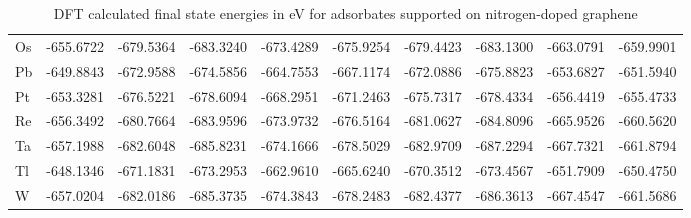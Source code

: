 \begin{table}[h]
{\begin{tabular}{*{10}{l}}
      Os	& -655.6722	&-679.5364	&-683.3240  &-673.4289	&-675.9254	&-679.4423	&-683.1300	&-663.0791	&-659.9901 \\
      Pb	& -649.8843	&-672.9588	&-674.5856	&-664.7553	&-667.1174	&-672.0886	&-675.8823	&-653.6827	&-651.5940 \\
      Pt	& -653.3281	&-676.5221	&-678.6094	&-668.2951	&-671.2463	&-675.7317	&-678.4334	&-656.4419	&-655.4733 \\
      Re	& -656.3492	&-680.7664	&-683.9596	&-673.9732	&-676.5164	&-681.0627	&-684.8096	&-665.9526	&-660.5620 \\
      Ta	& -657.1988	&-682.6048	&-685.8231	&-674.1666	&-678.5029	&-682.9709	&-687.2294	&-667.7321	&-661.8794 \\
      Tl	& -648.1346	&-671.1831	&-673.2953	&-662.9610  &-665.6240  &-670.3512	&-673.4567	&-651.7909	&-650.4750 \\
      W	  & -657.0204	&-682.0186	&-685.3735	&-674.3843	&-678.2483	&-682.4377	&-686.3613	&-667.4547	&-661.5686 \\
      \hline
    \end{tabular}
    }
    \caption{DFT calculated final state energies in eV for adsorbates supported on nitrogen-doped graphene}
    \label{si_table5:e_n_gra}
\end{table}


